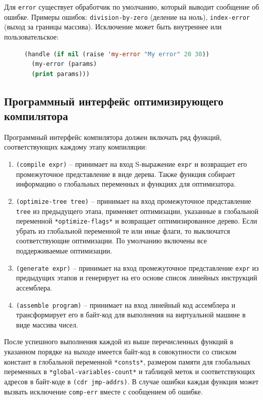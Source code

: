 Для \texttt{error} существует обработчик по умолчанию, который выводит сообщение об ошибке. Примеры ошибок: \texttt{division-by-zero} (деление на ноль), \texttt{index-error} (выход за границы массива). Исключение может быть внутреннее или пользовательское:

\begin{figure}[H]
\begin{lstlisting}[language=Lisp]
(handle (if nil (raise 'my-error "My error" 20 30))
  (my-error (params)
  (print params)))
\end{lstlisting}
\end{figure}


\subsection{Программный интерфейс оптимизирующего компилятора}

Программный интерфейс компилятора должен включать ряд функций, соответствующих каждому этапу компиляции:

\begin{enumerate}
\item \texttt{(compile expr)} -- принимает на вход S-выражение \texttt{expr} и возвращает его промежуточное представление в виде дерева. Также функция собирает информацию о глобальных переменных и функциях для оптимизатора.
\item \texttt{(optimize-tree tree)} -- принимает на вход промежуточное представление \texttt{tree} из предыдущего этапа, применяет оптимизации, указанные в глобальной переменной \texttt{*optimize-flags*} и возвращает оптимизированное дерево. Если убрать из глобальной переменной те или иные флаги, то выключатся соответствующие оптимизации. По умолчанию включены все поддерживаемые оптимизации.
\item \texttt{(generate expr)} -- принимает на вход промежуточное представление \texttt{expr} из предыдущих этапов и генерирует на его основе список линейных инструкций ассемблера.
\item \texttt{(assemble program)} -- принимает на вход линейный код ассемблера и трансформирует его в байт-код для выполнения на виртуальной машине в виде массива чисел.
\end{enumerate}

После успешного выполнения каждой из выше перечисленных функций в указанном порядке на выходе имеется байт-код в совокупности со списком констант в глобальной переменной \texttt{*consts*}, размером памяти для глобальных переменных в \texttt{*global-variables-count*} и таблицей меток и соответствующих адресов в байт-коде в \texttt{(cdr jmp-addrs)}. В случае ошибки каждая функция может вызвать исключение \texttt{comp-err} вместе с сообщением об ошибке.


